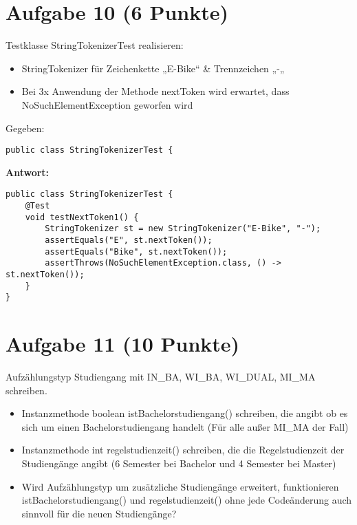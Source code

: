 \section{Aufgabe 10 (6 Punkte)}

Testklasse StringTokenizerTest realisieren:

\begin{itemize}
    \item StringTokenizer für Zeichenkette „E-Bike“ \& Trennzeichen „-„
    \item Bei 3x Anwendung der Methode nextToken wird erwartet, dass
          NoSuchElementException geworfen wird
\end{itemize}

Gegeben:
\begin{lstlisting}
public class StringTokenizerTest {
\end{lstlisting}

\textbf{Antwort:}

\begin{lstlisting}
public class StringTokenizerTest {
    @Test
    void testNextToken1() {
        StringTokenizer st = new StringTokenizer("E-Bike", "-");
        assertEquals("E", st.nextToken());
        assertEquals("Bike", st.nextToken());
        assertThrows(NoSuchElementException.class, () -> st.nextToken());
    }
}
\end{lstlisting}

\section{Aufgabe 11 (10 Punkte)}

Aufzählungstyp Studiengang mit IN\_BA, WI\_BA, WI\_DUAL, MI\_MA schreiben.

\begin{itemize}
    \item Instanzmethode boolean istBachelorstudiengang() schreiben, die angibt ob es
          sich um einen Bachelorstudiengang handelt (Für alle außer MI\_MA der Fall)
    \item Instanzmethode int regelstudienzeit() schreiben, die die Regelstudienzeit der
          Studiengänge angibt (6 Semester bei Bachelor und 4 Semester bei Master)
    \item Wird Aufzählungstyp um zusätzliche Studiengänge erweitert, funktionieren
          istBachelorstudiengang() und regelstudienzeit() ohne jede Codeänderung auch
          sinnvoll für die neuen Studiengänge?
\end{itemize}


